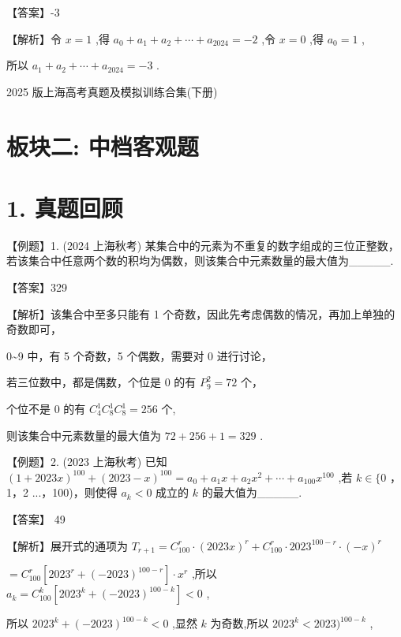\documentclass[10pt]{article}
\begin{document}
【答案】-3

【解析】令 \(x = 1\) ,得 \({a}_{0} + {a}_{1} + {a}_{2} + \cdots  + {a}_{2024} =  - 2\) ,令 \(x = 0\) ,得 \({a}_{0} = 1\) ,

所以 \({a}_{1} + {a}_{2} + \cdots  + {a}_{2024} =  - 3\) .

2025 版上海高考真题及模拟训练合集(下册)

\section*{板块二: 中档客观题}

\section*{1. 真题回顾}

【例题】1. (2024 上海秋考) 某集合中的元素为不重复的数字组成的三位正整数，若该集合中任意两个数的积均为偶数，则该集合中元素数量的最大值为\_\_\_\_\_.

【答案】329

【解析】该集合中至多只能有 1 个奇数，因此先考虑偶数的情况，再加上单独的奇数即可，

0\textasciitilde 9 中，有 5 个奇数，5 个偶数，需要对 0 进行讨论，

若三位数中，都是偶数，个位是 0 的有 \({P}_{9}^{2} = {72}\) 个，

个位不是 0 的有 \({C}_{4}^{1}{C}_{8}^{1}{C}_{8}^{1} = {256}\) 个,

则该集合中元素数量的最大值为 \({72} + {256} + 1 = {329}\) .

【例题】2. (2023 上海秋考) 已知 \({\left( 1 + {2023}x\right) }^{100} + {\left( {2023} - x\right) }^{100} = {a}_{0} + {a}_{1}x + {a}_{2}{x}^{2} + \cdots  + {a}_{100}{x}^{100}\) ,若 \(k \in  \{ 0\) ，1，2 ...，100)，则使得 \({a}_{k} < 0\) 成立的 \(k\) 的最大值为\_\_\_\_\_.

【答案】 49

【解析】展开式的通项为 \({T}_{r + 1} = {C}_{100}^{r} \cdot  {\left( {2023}x\right) }^{r} + {C}_{100}^{r} \cdot  {2023}^{{100} - r} \cdot  {\left( -x\right) }^{r}\)

\(= {C}_{100}^{r}\left\lbrack  {{2023}^{r} + {\left( -{2023}\right) }^{{100} - r}}\right\rbrack   \cdot  {x}^{r}\) ,所以 \({a}_{k} = {C}_{100}^{k}\left\lbrack  {{2023}^{k} + {\left( -{2023}\right) }^{{100} - k}}\right\rbrack   < 0\) ,

所以 \({2023}^{k} + {\left( -{2023}\right) }^{{100} - k} < 0\) ,显然 \(k\) 为奇数,所以 \({2023}^{k} < {2023}{)}^{{100} - k}\) ,
\end{document}
